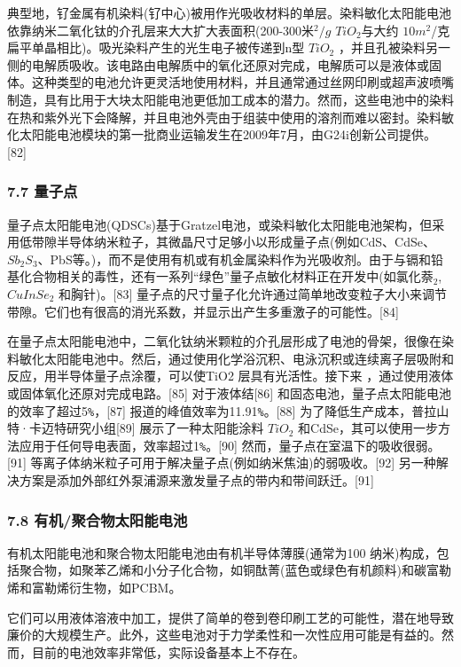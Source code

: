 典型地，钌金属有机染料(钌中心)被用作光吸收材料的单层。染料敏化太阳能电池依靠纳米二氧化钛的介孔层来大大扩大表面积(200-300米$^2/g$ $TiO_2$与大约 $10 m^2$/克扁平单晶相比)。吸光染料产生的光生电子被传递到n型 $TiO_2$ ，并且孔被染料另一侧的电解质吸收。该电路由电解质中的氧化还原对完成，电解质可以是液体或固体。这种类型的电池允许更灵活地使用材料，并且通常通过丝网印刷或超声波喷嘴制造，具有比用于大块太阳能电池更低加工成本的潜力。然而，这些电池中的染料在热和紫外光下会降解，并且电池外壳由于组装中使用的溶剂而难以密封。染料敏化太阳能电池模块的第一批商业运输发生在2009年7月，由G24i创新公司提供。[82]

\subsubsection{7.7 量子点}

量子点太阳能电池(QDSCs)基于Gratzel电池，或染料敏化太阳能电池架构，但采用低带隙半导体纳米粒子，其微晶尺寸足够小以形成量子点(例如CdS、CdSe、 $Sb_2S_3$、PbS等。)，而不是使用有机或有机金属染料作为光吸收剂。由于与镉和铅基化合物相关的毒性，还有一系列“绿色”量子点敏化材料正在开发中(如氯化萘$_2$, $CuInSe_2$ 和胸针)。[83] 量子点的尺寸量子化允许通过简单地改变粒子大小来调节带隙。它们也有很高的消光系数，并显示出产生多重激子的可能性。[84]

在量子点太阳能电池中，二氧化钛纳米颗粒的介孔层形成了电池的骨架，很像在染料敏化太阳能电池中。然后，通过使用化学浴沉积、电泳沉积或连续离子层吸附和反应，用半导体量子点涂覆，可以使TiO2 层具有光活性。接下来 ，通过使用液体或固体氧化还原对完成电路。[85] 对于液体结[86] 和固态电池，量子点太阳能电池的效率了超过5\verb|%|，[87] 报道的峰值效率为11.91\verb|%|。[88] 为了降低生产成本，普拉山特·卡迈特研究小组[89] 展示了一种太阳能涂料 $TiO_2$ 和CdSe，其可以使用一步方法应用于任何导电表面，效率超过1\verb|%|。[90] 然而，量子点在室温下的吸收很弱。[91] 等离子体纳米粒子可用于解决量子点(例如纳米焦油)的弱吸收。[92] 另一种解决方案是添加外部红外泵浦源来激发量子点的带内和带间跃迁。[91]

\subsubsection{7.8 有机/聚合物太阳能电池}

有机太阳能电池和聚合物太阳能电池由有机半导体薄膜(通常为100 纳米)构成，包括聚合物，如聚苯乙烯和小分子化合物，如铜酞菁(蓝色或绿色有机颜料)和碳富勒烯和富勒烯衍生物，如PCBM。

它们可以用液体溶液中加工，提供了简单的卷到卷印刷工艺的可能性，潜在地导致廉价的大规模生产。此外，这些电池对于力学柔性和一次性应用可能是有益的。然而，目前的电池效率非常低，实际设备基本上不存在。

